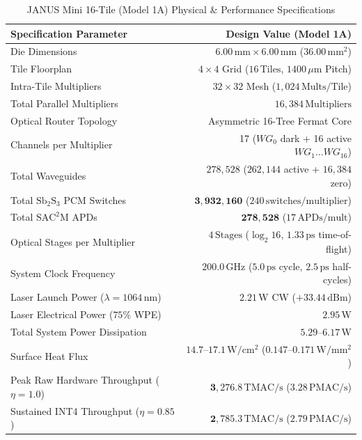 \documentclass[journal]{IEEEtran}
\begin{document}
\begin{table}[!htbp]
\centering
\footnotesize
\caption{JANUS Mini 16-Tile (Model 1A) Physical \& Performance Specifications}
\label{tab:model_1a_specs}
\begin{tabularx}{\columnwidth}{>{\raggedright\arraybackslash}X r}
\toprule
\textbf{Specification Parameter} & \textbf{Design Value (Model 1A)} \\
\midrule
Die Dimensions & $6.00\,\mathrm{mm} \times 6.00\,\mathrm{mm}$ ($36.00\,\mathrm{mm^2}$) \\
Tile Floorplan & $4 \times 4$ Grid ($16\,\mathrm{Tiles}$, $1400\,\mu\mathrm{m}$ Pitch) \\
Intra-Tile Multipliers & $32 \times 32$ Mesh ($1,024\,\mathrm{Mults/Tile}$) \\
Total Parallel Multipliers & $16,384\,\mathrm{Multipliers}$ \\
Optical Router Topology & Asymmetric 16-Tree Fermat Core \\
Channels per Multiplier & 17 ($WG_0$ dark + 16 active $WG_1 \dots WG_{16}$) \\
Total Waveguides & $278,528$ ($262,144$ active + $16,384$ zero) \\
Total $\mathrm{Sb_2S_3}$ PCM Switches & $\mathbf{3,932,160}$ ($240\,\mathrm{switches/multiplier}$) \\
Total $\mathrm{SAC^2M}$ APDs & $\mathbf{278,528}$ ($17\,\mathrm{APDs/mult}$) \\
Optical Stages per Multiplier & $4\,\mathrm{Stages}$ ($\log_2 16$, $1.33\,\mathrm{ps}$ time-of-flight) \\
System Clock Frequency & $200.0\,\mathrm{GHz}$ ($5.0\,\mathrm{ps}$ cycle, $2.5\,\mathrm{ps}$ half-cycles) \\
Laser Launch Power ($\lambda=1064\,\mathrm{nm}$) & $2.21\,\mathrm{W}$ CW ($+33.44\,\mathrm{dBm}$) \\
Laser Electrical Power ($75\%$ WPE) & $2.95\,\mathrm{W}$ \\
Total System Power Dissipation & $\mathbf{5.29\text{--}6.17\,\mathrm{W}}$ \\
Surface Heat Flux & $14.7\text{--}17.1\,\mathrm{W/cm^2}$ ($0.147\text{--}0.171\,\mathrm{W/mm^2}$) \\
\midrule
Peak Raw Hardware Throughput ($\eta = 1.0$) & $\mathbf{3,276.8\,\mathrm{TMAC/s}}$ ($3.28\,\mathrm{PMAC/s}$) \\
Sustained INT4 Throughput ($\eta = 0.85$) & $\mathbf{2,785.3\,\mathrm{TMAC/s}}$ ($2.79\,\mathrm{PMAC/s}$) \\

\end{tabularx}
\end{table}
\end{document}
